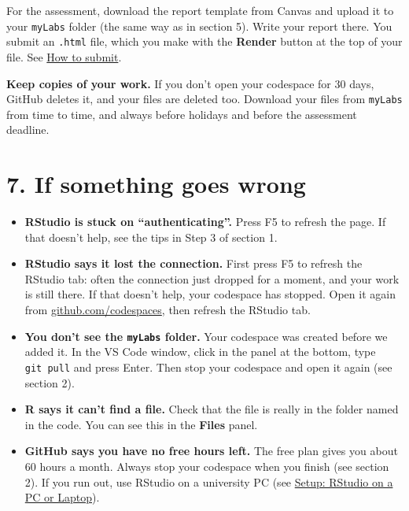 \documentclass[
  letterpaper,
  DIV=11,
  numbers=noendperiod]{scrreprt}
\providecommand{\tightlist}{%
  \setlength{\itemsep}{0pt}\setlength{\parskip}{0pt}}
\begin{document}
For the assessment, download the report template from Canvas and upload
it to your \texttt{myLabs} folder (the same way as in section 5). Write
your report there. You submit an \texttt{.html} file, which you make
with the \textbf{Render} button at the top of your file. See
\href{howSubmit.qmd}{How to submit}.

\begin{tcolorbox}[enhanced jigsaw, arc=.35mm, bottomrule=.15mm, bottomtitle=1mm, breakable, colback=white, colbacktitle=quarto-callout-warning-color!10!white, colframe=quarto-callout-warning-color-frame, coltitle=black, left=2mm, leftrule=.75mm, opacityback=0, opacitybacktitle=0.6, rightrule=.15mm, title=\textcolor{quarto-callout-warning-color}{\faExclamationTriangle}\hspace{0.5em}{Warning}, titlerule=0mm, toprule=.15mm, toptitle=1mm]

\textbf{Keep copies of your work.} If you don't open your codespace for
30 days, GitHub deletes it, and your files are deleted too. Download
your files from \texttt{myLabs} from time to time, and always before
holidays and before the assessment deadline.

\end{tcolorbox}

\section*{7. If something goes wrong}\label{if-something-goes-wrong}


\begin{itemize}
\tightlist
\item
  \textbf{RStudio is stuck on ``authenticating''.} Press F5 to refresh
  the page. If that doesn't help, see the tips in Step 3 of section 1.
\item
  \textbf{RStudio says it lost the connection.} First press F5 to
  refresh the RStudio tab: often the connection just dropped for a
  moment, and your work is still there. If that doesn't help, your
  codespace has stopped. Open it again from
  \href{https://github.com/codespaces}{github.com/codespaces}, then
  refresh the RStudio tab.
\item
  \textbf{You don't see the \texttt{myLabs} folder.} Your codespace was
  created before we added it. In the VS Code window, click in the panel
  at the bottom, type \texttt{git\ pull} and press Enter. Then stop your
  codespace and open it again (see section 2).
\item
  \textbf{R says it can't find a file.} Check that the file is really in
  the folder named in the code. You can see this in the \textbf{Files}
  panel.
\item
  \textbf{GitHub says you have no free hours left.} The free plan gives
  you about 60 hours a month. Always stop your codespace when you finish
  (see section 2). If you run out, use RStudio on a university PC (see
  \href{localSetup.qmd}{Setup: RStudio on a PC or Laptop}).
\end{itemize}
\end{document}
